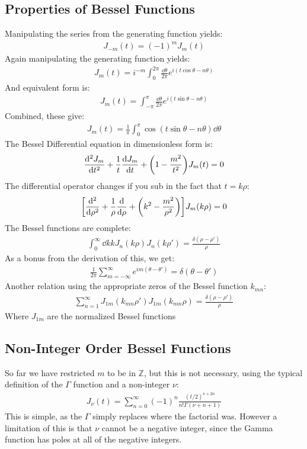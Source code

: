 \documentclass[12pt]{article}
\theoremstyle{plain}
\theoremstyle{definition}
\begin{document}
\subsection{Properties of Bessel Functions}
Manipulating the series from the generating function yields:
\begin{align*}
  J_{-m}(t)=(-1)^mJ_m(t)
\end{align*}
Again manipulating the generating function yields:
\begin{align*}
  J_m(t)=i^{-m}\int_0^{2\pi}\frac{\dd{\theta}}{2\pi}e^{i(t\cos\theta-n\theta)}
\end{align*}
And equivalent form is:
\begin{align*}
  J_m(t)=\int_{-\pi}^{\pi}\frac{\dd{\theta}}{2\pi}e^{i(t\sin\theta-n\theta)}
\end{align*}
Combined, these give:
\begin{align*}
  J_m(t)=\frac1\pi\int_0^\pi\cos(t\sin\theta-n\theta)\dd\theta
\end{align*}
The Bessel Differential equation in dimensionless form is:
\begin{align*}
  \dv[2]{J_m}{t}+\frac1t\dv{J_m}{t}+\qty(1-\frac{m^2}{t^2})J_m(t)=0
\end{align*}
The differential operator changes if you sub in the fact that $t=k\rho$:
\begin{align*}
  \qty[\dv[2]{\rho}+\frac1\rho\dv{\rho}+\qty(k^2-\frac{m^2}{\rho^2})]
  J_m(k\rho)=0
\end{align*}
The Bessel functions are complete:
\begin{align*}
  \int_0^\infty\dd{k}kJ_n(k\rho)J_n(k\rho')=\frac{\delta(\rho-\rho')}{\rho}
\end{align*}
As a bonus from the derivation of this, we get:
\begin{align*}
  \frac1{2\pi}\sum_{m=-\infty}^\infty e^{im(\theta-\theta')}=
  \delta(\theta-\theta')
\end{align*}
Another relation using the appropriate zeros of the Bessel function $k_{mn}$:
\begin{align*}
  \sum_{n=1}^\infty J_{1m}(k_{mn}\rho')J_{1m}(k_{mn}\rho)
  =\frac{\delta(\rho-\rho')}\rho
\end{align*}
Where $J_{1m}$ are the normalized Bessel functions

\subsection{Non-Integer Order Bessel Functions}
So far we have restricted $m$ to be in $\mathbb{Z}$, but this is not necessary, using the typical definition of the $\Gamma$ function and a non-integer $\nu$:
\begin{align*}
  J_\nu(t)=\sum_{n=0}^\infty(-1)^n\frac{(t/2)^{\nu+2n}}{n!\Gamma(\nu+n+1)}
\end{align*}
This is simple, as the $\Gamma$ simply replaces where the factorial was. However a limitation of this is that $\nu$ cannot be a negative integer, since the Gamma function has poles at all of the negative integers.
\end{document}
